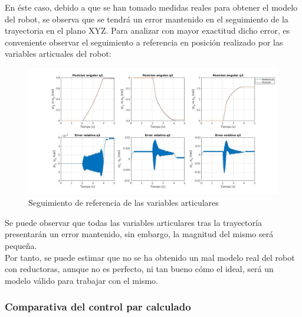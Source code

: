 \begin{itemize}
	En éste caso, debido a que se han tomado medidas reales para obtener el modelo del robot, se observa que se tendrá un error mantenido en el seguimiento de la trayectoria en el plano XYZ. Para analizar con mayor exactitud dicho error, es conveniente observar el seguimiento a referencia en posición realizado por las variables articuales del robot:

	\begin{figure}[h!]
		\centering
		\includegraphics[width=.8\textwidth]{exp3_posPDrealCR}
		\caption{Seguimiento de referencia de las variables articulares}
	\end{figure}

Se puede observar que todas las variables articulares tras la trayectoría presentarán un error mantenido, sin embargo, la magnitud del mismo será pequeña.\\
Por tanto, se puede estimar que no se ha obtenido un mal modelo real del robot con reductoras, aunque no es perfecto, ni tan bueno cómo el ideal, será un modelo válido para trabajar con el mismo.

\end{itemize}

\newpage
\subsubsection{Comparativa del control par calculado}
